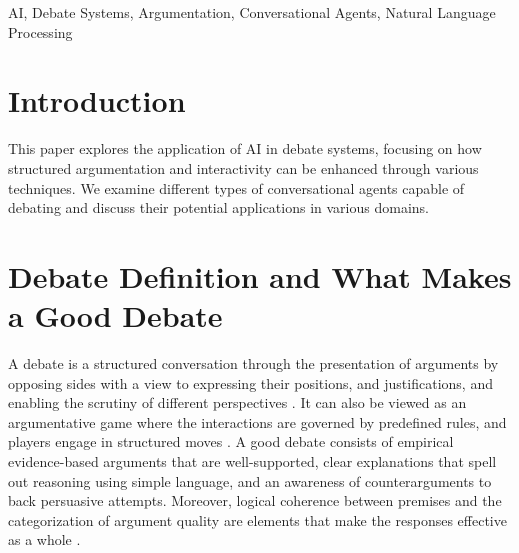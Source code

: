 \documentclass[conference]{IEEEtran}
\begin{document}
\begin{IEEEkeywords}
AI, Debate Systems, Argumentation, Conversational Agents, Natural Language Processing
\end{IEEEkeywords}

\section{Introduction}
This paper explores the application of AI in debate systems, focusing on how structured argumentation and interactivity can be enhanced through various techniques. We examine different types of conversational agents capable of debating and discuss their potential applications in various domains.

\section{Debate Definition and What Makes a Good Debate}
A debate is a structured conversation through the presentation of arguments by opposing sides with a view to expressing their positions, and justifications, and enabling the scrutiny of different perspectives \cite{b1}\cite{b2}. It can also be viewed as an argumentative game where the interactions are governed by predefined rules, and players engage in structured moves \cite{b6}. A good debate consists of empirical evidence-based arguments that are well-supported, clear explanations that spell out reasoning using simple language, and an awareness of counterarguments to back persuasive attempts. Moreover, logical coherence between premises and the categorization of argument quality are elements that make the responses effective as a whole \cite{b6}.
\end{document}
